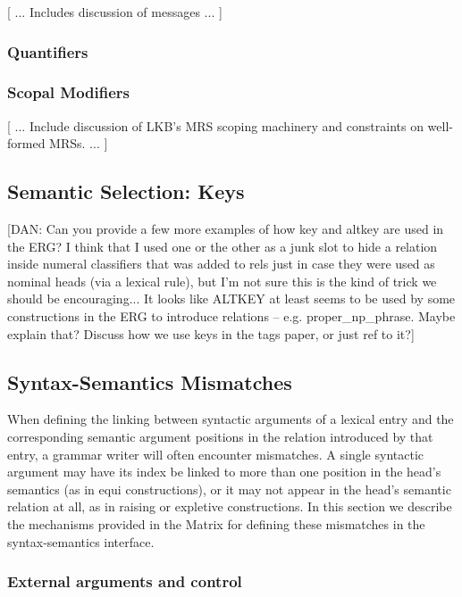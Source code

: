 \documentclass[12pt]{article}
\begin{document}
[ ... Includes discussion of messages ... ]

\subsubsection{Quantifiers}
\label{qqeq}
\subsubsection{Scopal Modifiers}

[ ... Include discussion of LKB's MRS scoping machinery and
constraints on well-formed MRSs. ... ]
 
\subsection{Semantic Selection: Keys}
\label{semselkey}

[DAN: Can you provide a few more examples of how {\sc key} and {\sc
altkey} are used in the ERG?  I think that I used one or the other as
a junk slot to hide a relation inside numeral classifiers that was
added to {\sc rels} just in case they were used as nominal heads (via
a lexical rule), but I'm not sure this is the kind of trick we should
be encouraging...  It looks like ALTKEY at least seems to be used by
some constructions in the ERG to introduce relations --
e.g. proper\_np\_phrase.  Maybe explain that? Discuss how we use keys
in the tags paper, or just ref to it?]

\subsection{Syntax-Semantics Mismatches}
\label{xargsec}

When defining the linking between syntactic arguments of a lexical entry
and the corresponding semantic argument positions in the relation introduced
by that entry, a grammar writer will often encounter mismatches.  A single
syntactic argument may have its index be linked to more than one position in
the head's semantics (as in equi constructions), or it may not appear in
the head's semantic relation at all, as in raising or expletive constructions.
In this section we describe the mechanisms provided in the Matrix for 
defining these mismatches in the syntax-semantics interface.

\subsubsection{External arguments and control}
\end{document}
